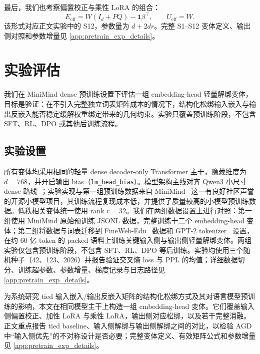 \documentclass{article}
\theoremstyle{plain}
\theoremstyle{definition}
\theoremstyle{remark}
\begin{document}
最后，我们也考察偏置校正与乘性 LoRA 的组合：
\begin{equation}
    E_{\mathrm{eff}} = W(I_d+PQ)-\mathbf{1}\beta^\top,\qquad U_{\mathrm{eff}}=W.
\end{equation}
该形式对应正文实验中的 S12，参数量为 $d+2dr$。完整 S1--S12 变体定义、输出侧对照和参数增量见 \cref{app:pretrain_exp_details}。




\section{实验评估}
\label{sec:experiments}

我们在 MiniMind dense 预训练设置下评估一组 embedding-head 轻量解绑变体，目标是验证：在不引入完整独立词表矩阵成本的情况下，结构化松绑输入嵌入与输出反嵌入能否稳定缓解权重绑定带来的几何约束。实验只覆盖预训练阶段，不包含 SFT、RL、DPO 或其他后训练流程。

\subsection{实验设置}
\label{sec:eval_exp_setup}

所有变体均采用相同的轻量 dense decoder-only Transformer 主干，隐藏维度为 $d=768$，并开启输出 bias（\texttt{lm\_head\_bias}）。模型架构主线对齐 Qwen3 小尺寸 dense 路线~\cite{yang2025qwen3}；实验实现与第一组预训练数据来自 MiniMind~\cite{gong2025minimind} 这一有良好社区声誉的开源小模型项目，其训练流程复现成本低，并提供了质量较高的小模型预训练数据。低秩相关变体统一使用 rank $r=32$。我们在两组数据设置上进行对照：第一组使用 MiniMind 原始预训练 JSONL 数据，完整训练十二个 embedding-head 变体；第二组将数据与词表迁移到 FineWeb-Edu~\cite{penedo2024fineweb} 数据和 GPT-2 tokenizer~\cite{radford2019language} 设置，在约 60 亿 token 的 packed 语料上训练关键输入侧与输出侧轻量解绑变体。两组实验仅包含预训练阶段，不包含 SFT、RL、DPO 等后训练。实验均使用三个随机种子（42、123、2026）并报告验证交叉熵 loss 与 PPL 的均值；详细数据切分、训练超参数、参数增量、梯度记录与日志路径见 \cref{app:pretrain_exp_details}。

为系统研究 tied 输入嵌入/输出反嵌入矩阵的结构化松绑方式及其对语言模型预训练的影响，本文在相同模型主干上构造一组 embedding-head 变体。它们覆盖输入侧偏置校正、加性 LoRA 与乘性 LoRA，输出侧对应松绑，以及若干完整消融。正文重点报告 tied baseline、输入侧解绑与输出侧解绑之间的对比，以检验 AGD 中“输入侧优先”的不对称设计是否必要；完整变体定义、有效矩阵公式和参数增量见 \cref{app:pretrain_exp_details}。
\end{document}
